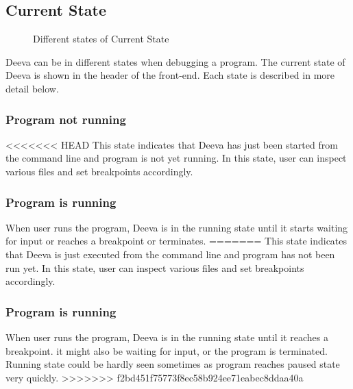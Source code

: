 \documentclass[11pt, a4paper]{article}
\begin{document}
\subsection{Current State}
\begin{figure}[h!]
\centering
{}
\quad
{}
\caption{Different states of Current State}
\label{fig:stateFeature}
\end{figure}
Deeva can be in different states when debugging a program. The current state of Deeva is shown in the header of the front-end. Each state is described in more detail below.
\subsubsection{Program not running}
<<<<<<< HEAD
This state indicates that Deeva has just been started from the command line and program is not yet running.
In this state, user can inspect various files and set breakpoints accordingly. 
\subsubsection{Program is running}
When user runs the program, Deeva is in the running state until it starts waiting for input or reaches a breakpoint or terminates. 
=======
This state indicates that Deeva is just executed from the command line and program has not been run yet. In this state, user can inspect various files and set breakpoints accordingly.
\subsubsection{Program is running}
When user runs the program, Deeva is in the running state until it reaches a breakpoint.
it might also be waiting for input, or the program is terminated.
Running state could be hardly seen sometimes as program reaches paused state very quickly.
>>>>>>> f2bd451f75773f8ec58b924ee71eabec8ddaa40a
\end{document}
